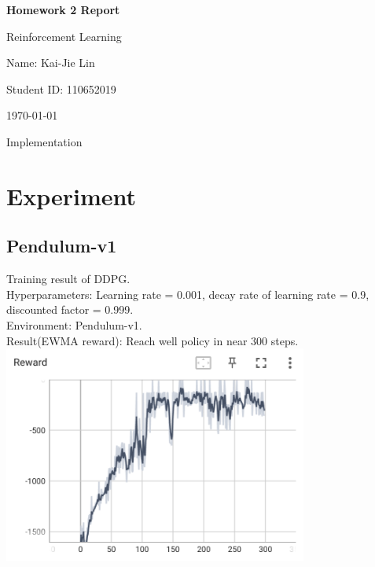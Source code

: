\documentclass{article} %
\newcommand{\question}[2][]{\begin{flushleft}\textbf{Question #1}: \textit{#2}\end{flushleft}}
\newcommand{\maketitletwo}[2][]{\begin{center}
        \Large{\textbf{Homework 2 Report}
        
            Reinforcement Learning} %
        \vspace{5pt}
        
        \normalsize{
            Name: Kai-Jie Lin 
            
            Student ID: 110652019
            
            \today}
        \vspace{15pt}
        \end{center}}
\begin{document}
    \maketitletwo[5]  %
    \section{Implementation}
    \section{Experiment}
    \subsection{Pendulum-v1}
    Training result of DDPG. \\
    Hyperparameters: Learning rate = 0.001, decay rate of learning rate = 0.9, discounted factor = 0.999. \\
    Environment: Pendulum-v1.\\
    Result(EWMA reward): Reach well policy in near 300 steps.\\
    \includegraphics[width=10cm]{./imgs/pendulum/rw.png}
    
\end{document}
